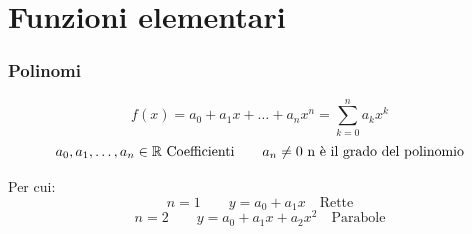 
\chapter{Funzioni elementari} %

\label{ch:funzioni-elementari} %


\subsection{Polinomi}
\[f(x)=a_0+a_1 x + \dots + a_n x^n =\displaystyle\sum_{k=0}^{n} a_k x^k \]
\[a_0, a_1, \dots, a_n \in \mathbb{R} \text{ Coefficienti}\qquad a_n \neq 0 \text{ n è il grado del polinomio}\]

Per cui:
\[n=1 \qquad y=a_0+a_1 x \quad \text{Rette}\]
\[n=2 \qquad y=a_0+a_1 x + a_2 x^2 \quad \text{Parabole}\]
